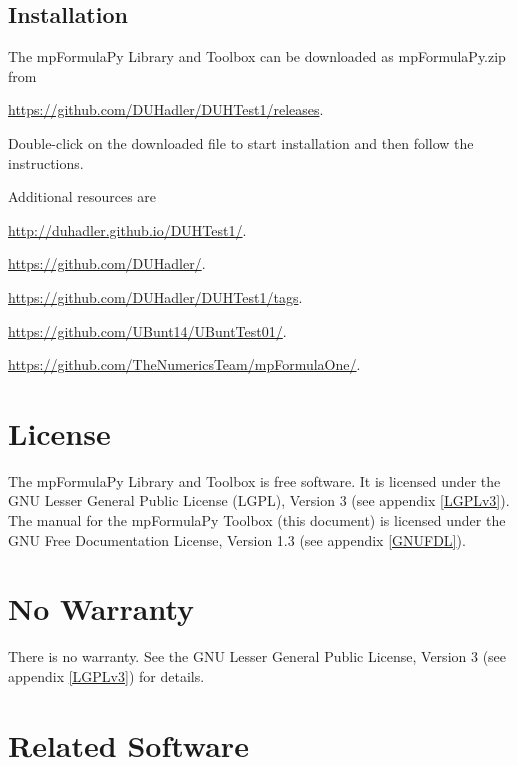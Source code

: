 \subsection{Installation}
\label{Installation}
The mpFormulaPy Library and Toolbox can be downloaded as mpFormulaPy.zip from 

\href{https://github.com/DUHadler/DUHTest1/releases}{https://github.com/DUHadler/DUHTest1/releases}. 

Double-click on the downloaded file to start installation and then follow the instructions.

\vpara

Additional resources are

\href{http://duhadler.github.io/DUHTest1/}{http://duhadler.github.io/DUHTest1/}. 


\href{https://github.com/DUHadler/}{https://github.com/DUHadler/}. 

\href{https://github.com/DUHadler/DUHTest1/tags}{https://github.com/DUHadler/DUHTest1/tags}. 

\href{https://github.com/UBunt14/UBuntTest01/}{https://github.com/UBunt14/UBuntTest01/}. 

\href{https://github.com/TheNumericsTeam/mpFormulaOne/}{https://github.com/TheNumericsTeam/mpFormulaOne/}. 


\section{License}
\label{mpFormulaLicense}

The mpFormulaPy Library and Toolbox is free software. It is licensed under the GNU Lesser General Public License (LGPL), Version 3 (see appendix \ref{LGPLv3}).
The manual for the mpFormulaPy Toolbox (this document) is licensed under the GNU Free Documentation License, Version 1.3 (see appendix \ref{GNUFDL}).




\section{No Warranty}
\label{No Warranty} 

There is no warranty. See the GNU  Lesser General Public License, Version 3 (see appendix \ref{LGPLv3}) for details.


\section{Related Software}

